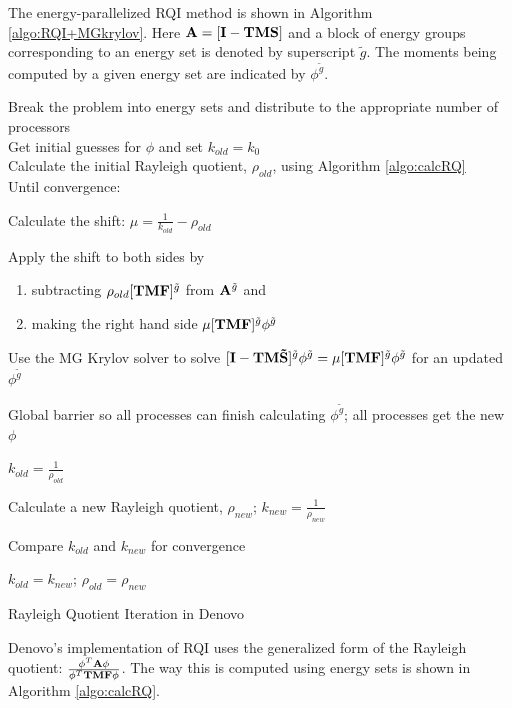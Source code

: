 The energy-parallelized RQI method is shown in Algorithm \ref{algo:RQI+MGkrylov}. Here $\mathbf{A} = [\mathbf{I} - \mathbf{TMS}]$ and a block of energy groups corresponding to an energy set is denoted by superscript ${\tilde{g}}$. The moments being computed by a given energy set are indicated by $\phi^{\tilde{g}}$.
%
\begin{algorithm}[!h]
  Break the problem into energy sets and distribute to the appropriate number of processors\\
  Get initial guesses for $\phi$ and set $k_{old} = k_{0}$\\
  Calculate the initial Rayleigh quotient, $\rho_{old}$, using Algorithm \ref{algo:calcRQ}\\
  Until convergence:
  \begin{list}{}{\hspace{2.5em}}
     \item Calculate the shift: $\mu = \frac{1}{k_{old}} - \rho_{old}$
     \item Apply the shift to both sides by 
     \begin{enumerate}
       \item subtracting $\rho_{old} [\mathbf{TMF}]^{\tilde{g}}$ from $\mathbf{A}^{\tilde{g}}$ and 
       \item making the right hand side $\mu [\mathbf{TMF}]^{\tilde{g}} \phi^{\tilde{g}}$
    \end{enumerate}
    \item Use the MG Krylov solver to solve $[\mathbf{I} - \mathbf{TM\tilde{S}}]^{\tilde{g}}\phi^{\tilde{g}} = \mu [\mathbf{TMF}]^{\tilde{g}} \phi^{\tilde{g}}$ for an updated $\phi^{\tilde{g}}$
    \item Global barrier so all processes can finish calculating $\phi^{\tilde{g}}$; all processes get the new $\phi$
    \item $k_{old} = \frac{1}{\rho_{old}}$
    \item Calculate a new Rayleigh quotient, $\rho_{new}$; $k_{new} = \frac{1}{\rho_{new}}$
    \item Compare $k_{old}$ and $k_{new}$ for convergence 
    \item $k_{old} = k_{new}$; $\rho_{old} = \rho_{new}$
  \end{list}
  \caption{Rayleigh Quotient Iteration in Denovo}
  \label{algo:RQI+MGkrylov}
\end{algorithm}
%
Denovo's implementation of RQI uses the generalized form of the Rayleigh quotient: $\frac{\phi^{T} \mathbf{A} \phi}{\phi^{T} \mathbf{TMF} \phi}$. The way this is computed using energy sets is shown in Algorithm \ref{algo:calcRQ}. 
